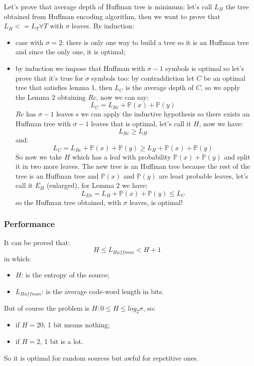 Let's prove that average depth of Huffman tree is minimum: let's call $L_H$ the tree obtained from Huffman encoding algorithm, then we want to prove that $L_H <= L_T \forall T $ with $\sigma$ leaves.
By induction:
\begin{itemize}
    \item case with $\sigma = 2$: there is only one way to build a tree so it is an Huffman tree and since the only one, it is optimal;

    \item by induction we impose that Huffman with $\sigma-1$ symbols is optimal so let's prove that it's true for $\sigma$ symbols too: by contraddiction let $C$ be an optimal tree that satisfies lemma 1, then $L_C$ is the average depth of $C$, so we apply the Lemma 2 obtaining $Rc$, now we can say:
    $$
        L_C = L_{Rc} + \mathbb{P}(x) + \mathbb{P}(y)
    $$
    $Rc$ has $\sigma-1$ leaves s we can apply the inductive hypothesis so there exists an Huffman tree with $\sigma-1$ leaves that is optimal, let's call it $H$, now we have:
    $$
        L_{Rc} \geq L_H
    $$
    and:
    $$
        L_C = L_{Rc} + \mathbb{P}(x) + \mathbb{P}(y) \geq L_H + \mathbb{P}(x) + \mathbb{P}(y)
    $$
    So now we take $H$ which has a leaf with probability $\mathbb{P}(x) + \mathbb{P}(y)$ and split it in two more leaves.
    The new tree is an Huffman tree because the rest of the tree is an Huffman tree and $\mathbb{P}(x)$ and $\mathbb{P}(y)$ are least probable leaves, let's call it $E_H$ (enlarged), for Lemma 2 we have:
    $$
        L_{Eh} = L_{H} + \mathbb{P}(x) + \mathbb{P}(y) \leq L_C
    $$
    so the Huffman tree obtained, with $\sigma$ leaves, is optimal!
\end{itemize}

\subsubsection{Performance}
It can be proved that:
$$
    H \leq L_{Huffman} < H+1
$$
in which:
\begin{itemize}
    \item $H$: is the entropy of the source;
    \item $L_{Huffman}$: is the average code-word length in bits.
\end{itemize}

But of course the problem is $H: 0 \leq H \leq log_2 \sigma$, so:
\begin{itemize}
    \item if $H=20$, 1 bit means nothing;
    \item if $H=2$, 1 bit is a lot.
\end{itemize}
So it is optimal for random sources but awful for repetitive ones.

